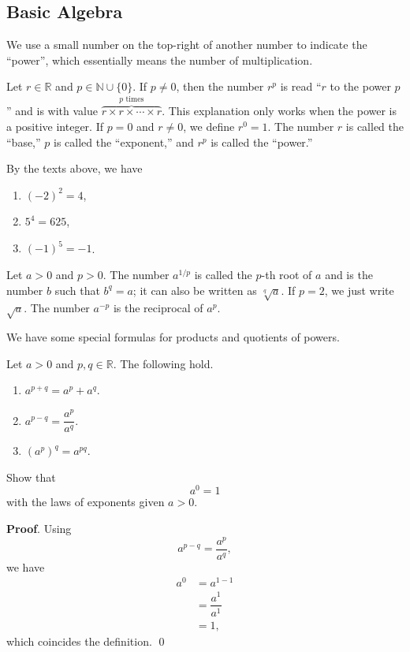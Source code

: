 \documentclass[11pt]{book}
\theoremstyle{break}
\theoremstyle{no_label}
\newcommand{\bbR}{\mathbb{R}}
\newcommand{\bbN}{\mathbb{N}}
\numberwithin{equation}{section}
\begin{document}
\subsection*{Basic Algebra}

We use a small number on the top-right of another number to indicate the ``power'', which essentially means the number of multiplication.
\begin{notation}
    Let $r\in\bbR$ and $p\in\bbN\cup\{0\}$. If $p\ne0$, then the number $r^p$ is read ``$r$ to the power $p$'' and is with value $\overbrace{r\times r\times \cdots\times r}^{\text{$p$ times}}$. This explanation only works when the power is a positive integer. If $p=0$ and $r\ne0$, we define $r^0=1$. The number $r$ is called the ``base,'' $p$ is called the ``exponent,'' and $r^p$ is called the ``power.''
\end{notation}

\begin{example}
    By the texts above, we have 
    \begin{enumerate}
        \item $(-2)^2=4$,
        \item $5^4=625$,
        \item $(-1)^5=-1$.
    \end{enumerate}
\end{example}

\begin{notation}
    Let $a>0$ and $p>0$. The number $a^{1/p}$ is called the $p$-th root of $a$ and is the number $b$ such that $b^q=a$; it can also be written as $\sqrt[q]{a}$. If $p=2$, we just write $\sqrt{a}$. The number $a^{-p}$ is the reciprocal of $a^p$.
\end{notation}

We have some special formulas for products and quotients of powers.

\begin{theorem}
    Let $a>0$ and $p, q\in\mathbb R$. The following hold.
    \begin{enumerate}
        \item $a^{p+q}=a^p+a^q$.
        \item $a^{p-q}=\dfrac{a^p}{a^q}$.
        \item $(a^p)^q=a^{pq}$.
    \end{enumerate}
\end{theorem}

\begin{example}
    Show that $$a^0=1$$ with the laws of exponents given $a>0$.
\end{example}
\textbf{Proof}. Using $$a^{p-q}=\dfrac{a^p}{a^q},$$ we have 
\begin{align*}
    a^0&=a^{1-1}\\
    &=\dfrac{a^1}{a^1}\\
    &=1,
\end{align*}
which coincides the definition. \qed
\end{document}
